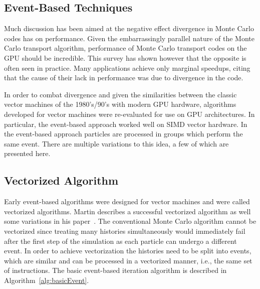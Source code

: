 \subsection{\textbf{Event-Based Techniques}}
\label{sec:EventBased}

Much discussion has been aimed at the negative effect divergence in Monte Carlo codes has on  performance.
%
Given the embarrassingly parallel nature of the Monte Carlo transport algorithm, performance of Monte Carlo transport codes on the GPU should be incredible.
%
This survey has shown however that the opposite is often seen in practice.
%
Many applications achieve only marginal speedups, citing that the cause of their lack in performance was due to divergence in the code.
%

%
In order to combat divergence and given the similarities between the classic vector machines of the 1980's/90's with modern GPU hardware, algorithms developed for vector machines were re-evaluated for use on GPU architectures.
%
In particular, the event-based approach worked well on SIMD vector hardware.
%
In the event-based approach particles are processed in groups which perform the same event.
%
There are multiple variations to this idea, a few of which are presented here.
%

\subsection*{\textbf{Vectorized Algorithm}}

%
Early event-based algorithms were designed for vector machines and were called vectorized algorithms.
%
Martin describes a successful vectorized algorithm as well some variations in his paper~\cite{martin1989successful}.
%
The conventional Monte Carlo algorithm cannot be vectorized since treating many histories simultaneously would immediately fail after the first step of the simulation as each particle can undergo a different event.
%
In order to achieve vectorization the histories need to be split into events, which are similar and can be processed in a vectorized manner, i.e., the same set of instructions.
%
The basic event-based iteration algorithm is described in Algorithm~\ref{alg:basicEvent}.
%

